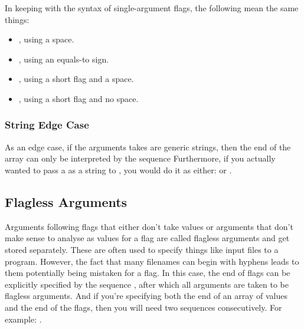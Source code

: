 In keeping with the syntax of single-argument flags, the following mean the same things:

\begin{itemize}
	\item {}, using a space.
	\item {}, using an equals-to sign.
	\item {}, using a short flag and a space.
	\item {}, using a short flag and no space.
\end{itemize}

\subsubsection{\monotext{--} String Edge Case}
As an edge case, if the arguments  takes are generic strings, then the end of the array can only be interpreted by the sequence \monotext{--} Furthermore, if you actually wanted to pass a \monotext{--} as a string to , you would do it as either:  or .

\subsection{Flagless Arguments}

Arguments following flags that either don't take values or arguments that don't make sense to analyse as values for a flag are called flagless arguments and get stored separately. These are often used to specify things like input files to a program. However, the fact that many filenames can begin with hyphens leads to them potentially being mistaken for a flag. In this case, the end of flags can be explicitly specified by the sequence \monotext{--}, after which all arguments are taken to be flagless arguments. And if you're specifying both the end of an array of values and the end of the flags, then you will need two \monotext{--} sequences consecutively. For example: .